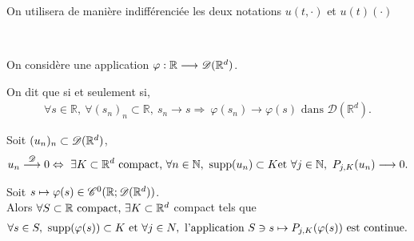 \documentclass[french,a4paper,10pt]{article}
\begin{document}
            On utilisera de manière indifférenciée les deux notations $u(t,\cdot)$ et $u(t)(\cdot)$\\
            \begin{definition}\label{2.2.1}~
            
                On considère une application $\varphi:\mathbb{R} \longrightarrow \mathscr{D}(\mathbb{R}^d)$. 
                
                On dit que  si et seulement si, 
                \begin{equation*}
                    \begin{aligned}
                        \forall s \in \mathbb{R}, \  \forall (s_n)_n \subset \mathbb{R}, \ s_n \to s \Rightarrow \ \varphi(s_n) \to \varphi(s) \text{ dans } \mathcal{D}(\mathbb{R}^d).
                    \end{aligned}
                \end{equation*}
            \end{definition}

            \begin{rappel}
                Soit $(u_n)_n \subset \mathscr{D}(\mathbb{R}^d)$,
                \begin{equation*}
                    \begin{aligned}
                        u_n \stackrel{\D}{\longrightarrow}0 \Leftrightarrow \ \exists K \subset \R^d \text{ compact,} \ \forall n \in \N, \ \text{supp}(u_n) \subset K \text{et } \forall j \in \N, \ P_{j,K}(u_n) \longrightarrow 0.
                    \end{aligned}
                \end{equation*}
            \end{rappel}

            \begin{proposition}\label{prop:2.2.2}
                Soit $s \mapsto \varphi(s) \in \mathscr{C}^0(\mathbb{R};\mathscr{D}(\mathbb{R}^d))$.\\
                Alors $\forall S \subset \mathbb{R} \text{ compact, } \exists K \subset \mathbb{R}^d$ compact tels que
                \begin{equation*}
                    \begin{aligned}
                        \forall s \in S, \ \text{supp}(\varphi(s)) \subset K \text{ et } \forall j \in N, \text{ l'application } S \ni s \mapsto P_{j,K}(\varphi(s)) \text{ est continue.}
                    \end{aligned}
                \end{equation*}
            \end{proposition}
\end{document}
